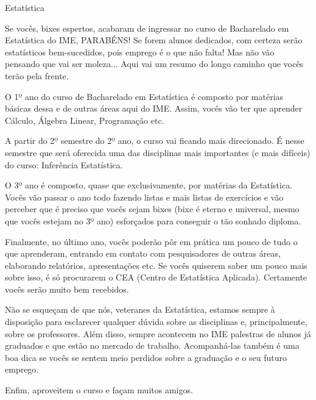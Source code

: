 \begin{subsecao}{Estatística}

Se vocês, bixes espertos, acabaram de ingressar no curso de Bacharelado em
Estatística do IME, PARABÉNS! Se forem alunos dedicados, com certeza serão
estatísticos bem-sucedidos, pois emprego é o que não falta! Mas não vão
pensando que vai ser moleza... Aqui vai um resumo do longo caminho que vocês
terão pela frente.

O 1º ano do curso de Bacharelado em Estatística é composto por matérias básicas
dessa e de outras áreas aqui do IME. Assim, vocês vão ter que aprender Cálculo,
Álgebra Linear, Programação etc.

A partir do 2º semestre do 2º ano, o curso vai ficando mais direcionado. É nesse
semestre que será oferecida uma das disciplinas mais importantes (e mais
difíceis) do curso: Inferência Estatística.

O 3º ano é composto, quase que exclusivamente, por matérias da
Estatística. Vocês vão passar o ano todo fazendo listas e mais listas de
exercícios e vão perceber que é preciso que vocês sejam bixes (bixe é eterno e
universal, mesmo que vocês estejam no 3º ano) esforçados para conseguir o tão
sonhado diploma.

Finalmente, no último ano, vocês poderão pôr em prática um pouco de tudo o que
aprenderam, entrando em contato com pesquisadores de outras áreas, elaborando
relatórios, apresentações etc. Se vocês quiserem saber um pouco mais sobre
isso, é só procurarem o CEA (Centro de Estatística Aplicada). Certamente vocês
serão muito bem recebidos.

Não se esqueçam de que nós, veteranes da Estatística, estamos sempre à
disposição para esclarecer qualquer dúvida sobre as disciplinas e,
principalmente, sobre os professores. Além disso, sempre acontecem no IME
palestras de alunos já graduados e que estão no mercado de trabalho. Acompanhá-las
também é uma boa dica se vocês se sentem meio perdidos sobre a graduação e
o seu futuro emprego.

Enfim, aproveitem o curso e façam muitos amigos.

\end{subsecao}
